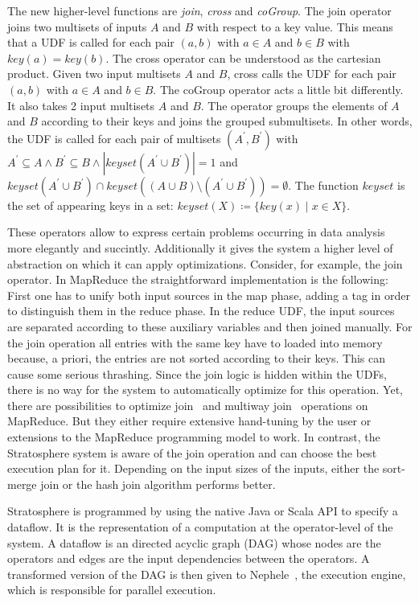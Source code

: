 The new higher-level functions are \emph{join}, \emph{cross} and \emph{coGroup}.
The join operator joins two multisets of inputs $A$ and $B$ with respect to a key value.
This means that a UDF is called for each pair $(a,b)$ with $a\in A$ and $b\in B$ with $key(a)=key(b)$.
The cross operator can be understood as the cartesian product.
Given two input multisets $A$ and $B$, cross calls the UDF for each pair $(a,b)$ with $a\in A$ and $b\in B$.
The coGroup operator acts a little bit differently.
It also takes 2 input multisets $A$ and $B$.
The operator groups the elements of $A$ and $B$ according to their keys and joins the grouped submultisets.
In other words, the UDF is called for each pair of multisets $(A^\prime, B^\prime)$ with $A^\prime \subseteq A \wedge B^\prime \subseteq B \wedge |keyset(A^\prime \cup B^\prime)| = 1$ and $keyset(A^\prime \cup B^\prime) \cap keyset((A \cup B) \setminus (A^\prime \cup B^\prime)) = \emptyset$.
The function $keyset$ is the set of appearing keys in a set: $keyset(X) \coloneqq \{ key(x) \mid x \in X \}$.

These operators allow to express certain problems occurring in data analysis more elegantly and succintly.
Additionally it gives the system a higher level of abstraction on which it can apply optimizations.
Consider, for example, the join operator.
In MapReduce the straightforward implementation is the following:
First one has to unify both input sources in the map phase, adding a tag in order to distinguish them in the reduce phase.
In the reduce UDF, the input sources are separated according to these auxiliary variables and then joined manually.
For the join operation all entries with the same key have to loaded into memory because, a priori, the entries are not sorted according to their keys.
This can cause some serious thrashing.
Since the join logic is hidden within the UDFs, there is no way for the system to automatically optimize for this operation.
Yet, there are possibilities to optimize join~\cite{blanas:2010a} and multiway join~\cite{afrati:2010a} operations on MapReduce.
But they either require extensive hand-tuning by the user or extensions to the MapReduce programming model to work.
In contrast, the Stratosphere system is aware of the join operation and can choose the best execution plan for it.
Depending on the input sizes of the inputs, either the sort-merge join or the hash join algorithm performs better.

Stratosphere is programmed by using the native Java or Scala API to specify a dataflow.
It is the representation of a computation at the operator-level of the system.
A dataflow is an directed acyclic graph (DAG) whose nodes are the operators and edges are the input dependencies between the operators.
A transformed version of the DAG is then given to Nephele~\cite{warneke:2009a}, the execution engine, which is responsible for parallel execution.

